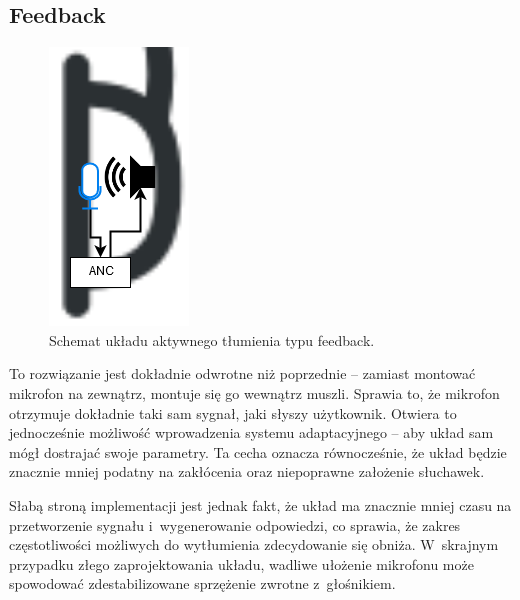 \subsection{Feedback}
\label{feedback}
\begin{figure}[h!]
	\centering
	\includegraphics[scale=0.7]{../Assets/feedback.png}
	\caption{Schemat układu aktywnego tłumienia typu feedback.}
	\label{fig:feedback}
\end{figure}
To rozwiązanie jest dokładnie odwrotne niż poprzednie -- zamiast montować mikrofon na zewnątrz, montuje się go wewnątrz muszli. Sprawia to, że mikrofon otrzymuje dokładnie taki sam sygnał, jaki słyszy użytkownik. Otwiera to jednocześnie możliwość wprowadzenia systemu adaptacyjnego -- aby układ sam mógł dostrajać swoje parametry. Ta cecha oznacza równocześnie, że układ będzie znacznie mniej podatny na zakłócenia oraz niepoprawne założenie słuchawek.

Słabą stroną implementacji jest jednak fakt, że układ ma znacznie mniej czasu na przetworzenie sygnału i~wygenerowanie odpowiedzi, co sprawia, że zakres częstotliwości możliwych do wytłumienia zdecydowanie się obniża. W~skrajnym przypadku złego zaprojektowania układu, wadliwe ułożenie mikrofonu może spowodować zdestabilizowane sprzężenie zwrotne z~głośnikiem.

